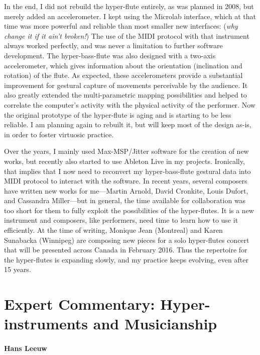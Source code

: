 In the end, I did not rebuild the hyper-flute entirely, as was planned in 2008, but merely added an accelerometer. I kept using the Microlab interface, which at that time was more powerful and reliable than most smaller new interfaces: (\emph{why change it if it ain't broken!}) The use of the MIDI protocol with that instrument always worked perfectly, and was never a limitation to further software development. The hyper-bass-flute was also designed with a two-axis accelerometer, which gives information about the orientation (inclination and rotation) of the flute. As expected, these accelerometers provide a substantial improvement for gestural capture of movements perceivable by the audience. It also greatly extended the multi-parametric mapping possibilities and helped to correlate the computer's activity with the physical activity of the performer. Now the original prototype of the hyper-flute is aging and is starting to be less reliable. I am planning again to rebuilt it, but will keep most of the design as-is, in order to foster virtuosic practice. 

Over the years, I mainly used Max-MSP/Jitter software for the creation of new works, but recently also started to use Ableton Live in my projects. Ironically, that implies that I now need to reconvert my hyper-bass-flute gestural data into MIDI protocol to interact with the software. In recent years, several composers have written new works for me---Martin Arnold, David Cronkite, Louis Dufort, and Cassandra Miller---but in general, the time available for collaboration was too short for them to fully exploit the possibilities of the hyper-flutes. It is a new instrument and composers, like performers, need time to learn how to use it efficiently. At the time of writing, Monique Jean (Montreal) and Karen Sunabacka (Winnipeg) are composing new pieces for a solo hyper-flutes concert that will be presented across Canada in February 2016. Thus the repertoire for the hyper-flutes is expanding slowly, and my practice keeps evolving, even after 15 years.



\section*{Expert Commentary: Hyper-instruments and Musicianship}

\paragraph{Hans Leeuw}

